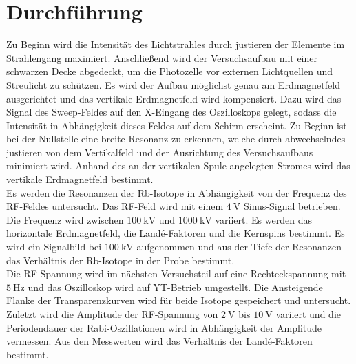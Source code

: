 \section{Durchführung}
\label{sec:Durchführung}

Zu Beginn wird die Intensität des Lichtstrahles durch justieren der Elemente im Strahlengang maximiert. Anschließend wird der Versuchsaufbau mit einer schwarzen Decke abgedeckt, um die Photozelle vor externen Lichtquellen und Streulicht zu schützen.
Es wird der Aufbau möglichst genau am Erdmagnetfeld ausgerichtet und das vertikale Erdmagnetfeld wird kompensiert. Dazu wird das Signal des Sweep-Feldes auf den X-Eingang des Oszilloskops gelegt, sodass die Intensität in Abhängigkeit dieses Feldes auf dem Schirm erscheint. Zu Beginn ist bei der Nullstelle eine breite Resonanz zu erkennen, welche durch abwechselndes justieren von dem Vertikalfeld und der Ausrichtung des Versuchsaufbaus minimiert wird. Anhand des an der vertikalen Spule angelegten Stromes wird das vertikale Erdmagnetfeld bestimmt.\\
Es werden die Resonanzen der Rb-Isotope in Abhängigkeit von der Frequenz des RF-Feldes untersucht. Das RF-Feld wird mit einem $\SI{4}{\volt}$ Sinus-Signal betrieben. Die Frequenz wird zwischen $\SI{100}{\kilo\volt}$ und $\SI{1000}{\kilo\volt}$ variiert. Es werden das horizontale Erdmagnetfeld, die Landé-Faktoren und die Kernspins bestimmt.
Es wird ein Signalbild bei $\SI{100}{\kilo\volt}$ aufgenommen und aus der Tiefe der Resonanzen das Verhältnis der Rb-Isotope in der Probe bestimmt.\\
Die RF-Spannung wird im nächsten Versuchsteil auf eine Rechteckspannung mit $\SI{5}{\hertz}$ und das Oszilloskop wird auf YT-Betrieb umgestellt. Die Ansteigende Flanke der Transparenzkurven wird für beide Isotope gespeichert und untersucht.\\
Zuletzt wird die Amplitude der RF-Spannung von $\SI{2}{\volt}$ bis $\SI{10}{\volt}$ variiert und die Periodendauer der Rabi-Oszillationen wird in Abhängigkeit der Amplitude vermessen. Aus den Messwerten wird das Verhältnis der Landé-Faktoren bestimmt. 
